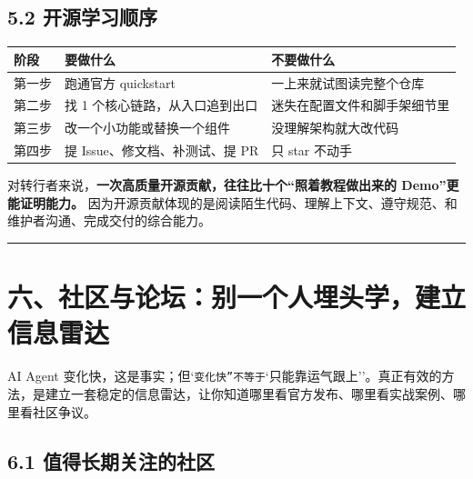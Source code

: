 \subsection{5.2 开源学习顺序}

\begingroup
\scriptsize
\setlength{\tabcolsep}{3pt}
\begin{longtable}{|p{}|p{}|p{}|}
\hline
阶段 & 要做什么 & 不要做什么 \\ \hline
第一步 & 跑通官方 quickstart & 一上来就试图读完整个仓库 \\ \hline
第二步 & 找 1 个核心链路，从入口追到出口 & 迷失在配置文件和脚手架细节里 \\ \hline
第三步 & 改一个小功能或替换一个组件 & 没理解架构就大改代码 \\ \hline
第四步 & 提 Issue、修文档、补测试、提 PR & 只 star 不动手 \\ \hline
\end{longtable}
\endgroup

对转行者来说，\textbf{一次高质量开源贡献，往往比十个``照着教程做出来的 Demo''更能证明能力。} 因为开源贡献体现的是阅读陌生代码、理解上下文、遵守规范、和维护者沟通、完成交付的综合能力。


\bigskip\hrule\bigskip

\section{六、社区与论坛：别一个人埋头学，建立信息雷达}

AI Agent 变化快，这是事实；但`\texttt{变化快''不等于}`只能靠运气跟上''。真正有效的方法，是建立一套稳定的信息雷达，让你知道哪里看官方发布、哪里看实战案例、哪里看社区争议。


\subsection{6.1 值得长期关注的社区}

